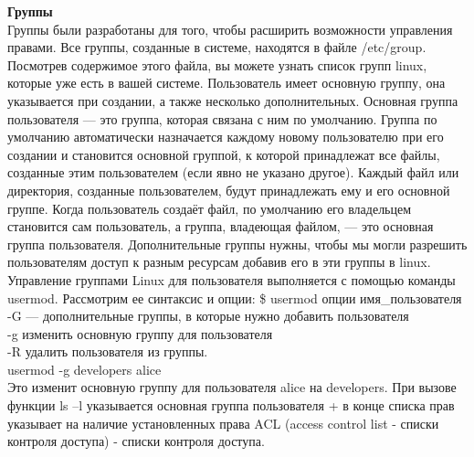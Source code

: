\noindent \textbf{Группы} \\
Группы были разработаны для того, чтобы расширить возможности управления правами. Все группы, созданные в системе, находятся в файле /etc/group. Посмотрев содержимое этого файла, вы можете узнать список групп linux, которые уже есть в вашей системе. Пользователь имеет основную группу, она указывается при создании, а также несколько дополнительных. Основная группа пользователя — это группа, которая связана с ним по умолчанию.  Группа по умолчанию автоматически назначается каждому новому пользователю при его создании и становится основной группой, к которой принадлежат все файлы, созданные этим пользователем (если явно не указано другое). Каждый файл или директория, созданные пользователем, будут принадлежать ему и его основной группе. Когда пользователь создаёт файл, по умолчанию его владельцем становится сам пользователь, а группа, владеющая файлом, — это основная группа пользователя. Дополнительные группы нужны, чтобы мы могли разрешить пользователям доступ к разным ресурсам добавив его в эти группы в linux. \\
Управление группами Linux для пользователя выполняется с помощью команды usermod. Рассмотрим ее синтаксис и опции:
\$ usermod опции имя\_пользователя \\
-G — дополнительные группы, в которые нужно добавить пользователя \\
-g изменить основную группу для пользователя \\
-R удалить пользователя из группы. \\
usermod -g developers alice \\
Это изменит основную группу для пользователя alice на developers. При вызове функции ls –l указывается основная группа пользователя + в конце списка прав указывает на наличие установленных права ACL (access control list - списки контроля доступа) - списки контроля доступа. \\

